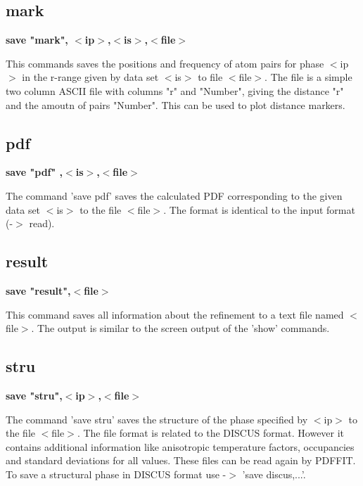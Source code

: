 \subsection*{mark}
{\bf save "mark", $ <$ip$> $,$ <$is$> $,$ <$file$> $ \par }
\par
\vspace{3pt}
This commands saves the positions and frequency of atom pairs 
for phase $ <$ip$> $ in the r-range given by data set $ <$is$> $ to file $ <$file$> $. 
The file is a simple two column ASCII file with columns "r" and 
"Number", giving the distance "r" and the amoutn of pairs "Number". 
This can be used to plot distance markers. 
\subsection*{pdf}
{\bf save "pdf" ,$ <$is$> $,$ <$file$> $ \par }
\par
\vspace{3pt}
The command 'save pdf' saves the calculated PDF corresponding 
to the given data set $ <$is$> $ to the file $ <$file$> $. The format 
is identical to the input format (-$> $ read). 
\subsection*{result}
{\bf save "result",$ <$file$> $ \par }
\par
\vspace{3pt}
This command saves all information about the refinement to 
a text file named $ <$file$> $. The output is similar to the screen 
output of the 'show' commands. 
\subsection*{stru}
{\bf save "stru",$ <$ip$> $,$ <$file$> $ \par }
\par
\vspace{3pt}
The command 'save stru' saves the structure of the phase 
specified by $ <$ip$> $ to the file $ <$file$> $. The file format is 
related to the DISCUS format. However it contains additional 
information like anisotropic temperature factors, occupancies 
and standard deviations for all values. These files can be 
read again by PDFFIT. To save a structural phase in DISCUS 
format use -$> $ 'save discus,...'. 
